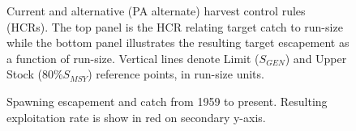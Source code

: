 \documentclass[11pt]{book}
\begin{document}
\begin{figure}[htb]

{\centering {} 

}

\caption{Current and alternative (PA alternate) harvest control rules (HCRs). The top panel is the HCR relating target catch to run-size while the bottom panel illustrates the resulting target escapement as a function of run-size. Vertical lines denote Limit (\(S_{GEN}\)) and Upper Stock (80\%\(S_{MSY}\)) reference points, in run-size units.}\label{fig:fig-HCRs}
\end{figure}

\begin{figure}[htb]

{\centering {} 

}

\caption{Spawning escapement and catch from 1959 to present. Resulting exploitation rate is show in red on secondary y-axis.}\label{fig:fig-catch-esc}
\end{figure}
\end{document}
